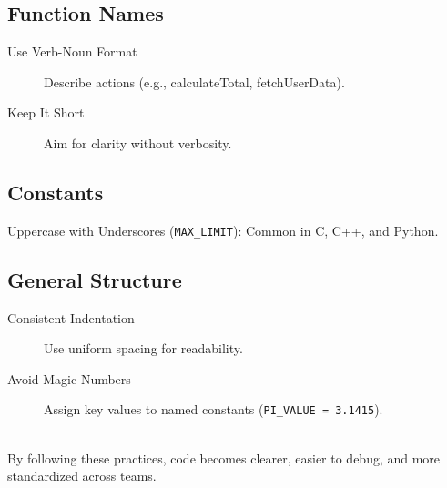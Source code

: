\documentclass[12pt]{article}
\begin{document}
\subsection*{Function Names}
\begin{description}
    \item[Use Verb-Noun Format] Describe actions (e.g., calculateTotal, fetchUserData).
    \item[Keep It Short] Aim for clarity without verbosity.
\end{description}

\subsection*{Constants}
Uppercase with Underscores (\verb|MAX_LIMIT|): Common in C, C++, and Python.

\subsection*{General Structure}
\begin{description}
    \item[Consistent Indentation] Use uniform spacing for readability.
    \item[Avoid Magic Numbers] Assign key values to named constants (\verb|PI_VALUE = 3.1415|).\\\\
\end{description}

By following these practices, code becomes clearer, easier to debug, and more standardized across teams.

% 
% 
\end{document}
